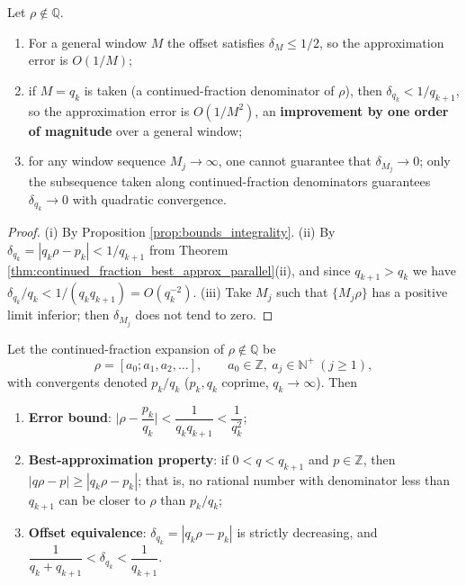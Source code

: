 \begin{proposition}\label{prop:error_denominator_scaling_parallel}
Let $\rho\notin\mathbb{Q}$.
\begin{enumerate}[label=(\roman*)]
    \item For a general window $M$ the offset satisfies $\delta_M\le1/2$, so the approximation error is $O(1/M)$;
    \item if $M=q_k$ is taken (a continued-fraction denominator of $\rho$), then $\delta_{q_k}<1/q_{k+1}$, so the approximation error is $O(1/M^2)$, an \textbf{improvement by one order of magnitude} over a general window;
    \item for any window sequence $M_j\to\infty$, one cannot guarantee that $\delta_{M_j}\to0$; only the subsequence taken along continued-fraction denominators guarantees $\delta_{q_k}\to0$ with quadratic convergence.
\end{enumerate}
\end{proposition}

\begin{proof}
(i) By Proposition \ref{prop:bounds_integrality}. (ii) By $\delta_{q_k}=|q_k\rho-p_k|<1/q_{k+1}$ from Theorem \ref{thm:continued_fraction_best_approx_parallel}(ii), and since $q_{k+1}>q_k$ we have $\delta_{q_k}/q_k<1/(q_kq_{k+1})=O(q_k^{-2})$. (iii) Take $M_j$ such that $\{M_j\rho\}$ has a positive limit inferior; then $\delta_{M_j}$ does not tend to zero.
\end{proof}

\begin{theorem}\label{thm:continued_fraction_best_approx_parallel}
Let the continued-fraction expansion of $\rho\notin\mathbb{Q}$ be
\[
\rho=[a_0;a_1,a_2,\dots],\qquad a_0\in\mathbb{Z},\ a_j\in\mathbb{N}^+\ (j\ge1),
\]
with convergents denoted $p_k/q_k$ ($p_k,q_k$ coprime, $q_k\to\infty$). Then
\begin{enumerate}[label=(\roman*)]
    \item \textbf{Error bound}: $\Big|\rho-\dfrac{p_k}{q_k}\Big|<\dfrac{1}{q_kq_{k+1}}<\dfrac{1}{q_k^2}$;
    \item \textbf{Best-approximation property}: if $0<q<q_{k+1}$ and $p\in\mathbb{Z}$, then $|q\rho-p|\ge|q_k\rho-p_k|$; that is, no rational number with denominator less than $q_{k+1}$ can be closer to $\rho$ than $p_k/q_k$;
    \item \textbf{Offset equivalence}: $\delta_{q_k}=|q_k\rho-p_k|$ is strictly decreasing, and $\dfrac{1}{q_k+q_{k+1}}<\delta_{q_k}<\dfrac{1}{q_{k+1}}$.
\end{enumerate}
\end{theorem}

